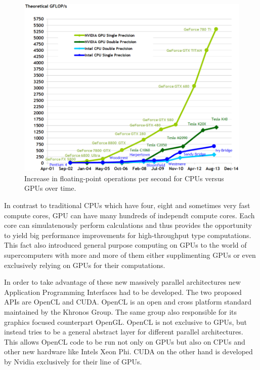 \documentclass[a4paper,11pt]{kth-mag}
\begin{document}
\begin{figure}
  \centering
  \includegraphics[width=\textwidth]{img/gpu_performance.pdf}
  \caption{Increase in floating-point operations per second for CPUs versus GPUs over time.}
  \label{fig:gpu_performance}
\end{figure}

In contrast to traditional CPUs which have four, eight and sometimes very fast compute cores, GPU can have many hundreds of independt compute cores. Each core can simulatenously perform calculations and thus provides the opportunity to yield big performance improvements for high-throughput type computations. This fact also introduced general purpose computing on GPUs to the world of supercomputers with more and more of them either supplimenting GPUs or even exclusively relying on GPUs for their computations.

In order to take advantage of these new massively parallel architectures new Application Programming Interfaces had to be developed. The two proposed APIs are OpenCL and CUDA. OpenCL is an open and cross platform standard maintained by the Khronos Group. The same group also responsible for its graphics focused counterpart OpenGL. OpenCL is not exclusive to GPUs, but instead tries to be a general abstract layer for different parallel architectures. This allows OpenCL code to be run not only on GPUs but also on CPUs and other new hardware like Intels Xeon Phi. CUDA on the other hand is developed by Nvidia exclusively for their line of GPUs.
\end{document}
